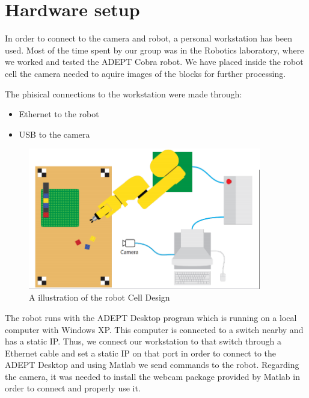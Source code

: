 \chapter{Hardware setup}\label{ch:hardware}
In order to connect to the camera and robot, a personal workstation has been used. Most of the time spent by our group was in the Robotics laboratory, where we worked and tested the ADEPT Cobra robot. We have placed inside the robot cell the camera needed to aquire images of the blocks for further processing. 

The phisical connections to the workstation were made through: 
\begin{itemize}
	\item Ethernet to the robot  
	\item USB to the camera 
\end{itemize}

\begin{figure}[hb]
\centering
\includegraphics[width=4in]{figures/robotCellDesign.png}
\caption[robot Cell Design]
{A illustration of the robot Cell Design}
\end{figure}

The robot runs with the ADEPT Desktop program which is running on a local computer with Windows XP. This computer is connected to a switch nearby and has a static IP. Thus, we connect our workstation to that switch through a Ethernet cable and set a static IP on that port in order to connect to the ADEPT Desktop and using Matlab we send commands to the robot. Regarding the camera, it was needed to install the webcam package provided by Matlab in order to connect and properly use it. 

